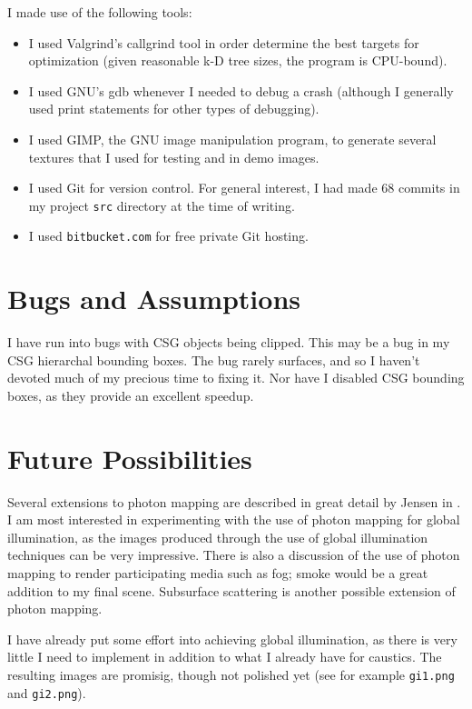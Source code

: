 \documentclass{article}
\begin{document}
I made use of the following tools:

\begin{itemize}
  \item I used Valgrind's callgrind tool in order determine the best targets for
optimization (given reasonable k-D tree sizes, the program is CPU-bound).

  \item I used GNU's gdb whenever I needed to debug a crash (although I generally used
print statements for other types of debugging).

  \item I used GIMP, the GNU image manipulation program, to generate several textures
that I used for testing and in demo images.

  \item I used Git for version control. For general interest, I had made $68$ commits
in my project {\tt src} directory at the time of writing.

  \item I used {\tt bitbucket.com} for free private Git hosting.
\end{itemize}

\section{Bugs and Assumptions}

I have run into bugs with CSG objects being clipped. This may be a bug in my CSG hierarchal bounding boxes. The bug rarely surfaces, and so I haven't devoted much of my precious time to fixing it. Nor have I disabled CSG bounding boxes, as they provide an excellent speedup.

\section{Future Possibilities}

Several extensions to photon mapping are described in great detail by Jensen in
\cite{coursenotes}. I am most interested in experimenting with the use of photon
mapping for global illumination, as the images produced through the use of
global illumination techniques can be very impressive. There is also a discussion
of the use of photon mapping to render participating media such as fog; smoke would
be a great addition to my final scene. Subsurface scattering is another possible
extension of photon mapping.

I have already put some effort into achieving global illumination, as there is very little I need to implement in addition to what I already have for caustics. The resulting images are promisig, though not polished yet (see for example {\tt gi1.png} and {\tt gi2.png}).
\end{document}
